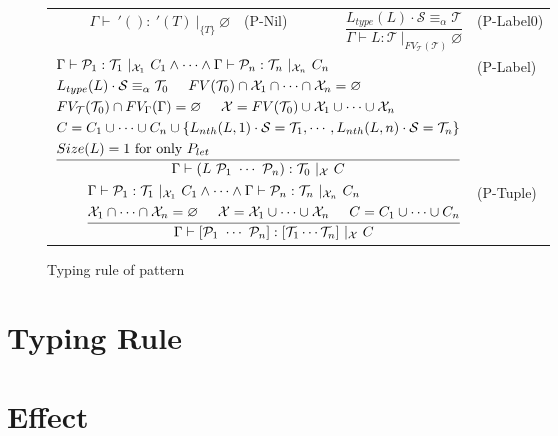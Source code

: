 \documentclass{article}
\begin{document}
\begin{figure}[tb]
    \centering
    \begin{tabular}{rlrl}
        $\Gamma \vdash\ '() :\ '(T)\ |_{\{T\}}\ \varnothing$ & (P-Nil) &
        $\dfrac{L_{type}(L) \cdot \mathcal{S} \equiv_\alpha \mathcal{T}}{\Gamma \vdash L : \mathcal{T}\ |_{FV_\mathcal{T}(\mathcal{T})}\ \varnothing}$ & (P-Label0) \vspace{5mm} \\

        \multicolumn{3}{r}{
        $\dfrac{
            \begin{aligned}
                &\Gamma \vdash \mathcal{P}_1 : \mathcal{T}_1\ |_{\mathcal{X}_1}\ C_1 \land \cdots \land
                    \Gamma \vdash \mathcal{P}_n : \mathcal{T}_n\ |_{\mathcal{X}_n}\ C_n \\
                &L_{type}(L) \cdot \mathcal{S}\equiv_\alpha \mathcal{T}_0 \hspace{5mm} FV(\mathcal{T}_0) \cap \mathcal{X}_1 \cap \cdots \cap \mathcal{X}_n = \varnothing \\
                &FV_\mathcal{T}(\mathcal{T}_0) \cap FV_\Gamma(\Gamma) = \varnothing \hspace{5mm}
                    \mathcal{X} = FV(\mathcal{T}_0) \cup \mathcal{X}_1 \cup \cdots \cup \mathcal{X}_n \\
                &C = C_1 \cup \cdots \cup C_n \cup \{L_{nth}(L, 1) \cdot \mathcal{S} = \mathcal{T}_1, \cdots, L_{nth}(L, n) \cdot \mathcal{S} = \mathcal{T}_n\} \\
                &Size(L) = 1\ \mbox{for only}\ P_{let}
            \end{aligned}
        }{
            \Gamma \vdash (L\ \mathcal{P}_1\ \cdots\ \mathcal{P}_n) : \mathcal{T}_0\ |_{\mathcal{X}}\ C
        }$} & (P-Label) \vspace{5mm} \\

        \multicolumn{3}{r}{
        $\dfrac{
            \begin{aligned}
                &\Gamma \vdash \mathcal{P}_1 : \mathcal{T}_1\ |_{\mathcal{X}_1}\ C_1 \land \cdots \land
                    \Gamma \vdash \mathcal{P}_n : \mathcal{T}_n\ |_{\mathcal{X}_n}\ C_n \\
                &\mathcal{X}_1 \cap \cdots \cap \mathcal{X}_n = \varnothing \hspace{5mm}
                    \mathcal{X} = \mathcal{X}_1 \cup \cdots \cup \mathcal{X}_n \hspace{5mm}
                    C = C_1 \cup \cdots \cup C_n
            \end{aligned}
        }{
            \Gamma \vdash [\mathcal{P}_1\ \cdots\ \mathcal{P}_n] : [\mathcal{T}_1 \cdots \mathcal{T}_n]\ |_{\mathcal{X}}\ C
        }$} & (P-Tuple) \\
    \end{tabular}
    \caption{Typing rule of pattern}
\end{figure}

\section{Typing Rule}

\section{Effect}
\label{sec:effect}
\end{document}
